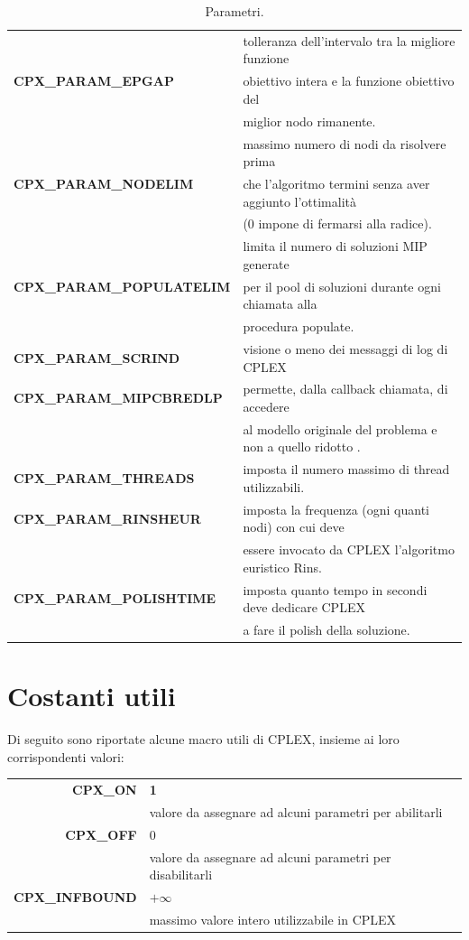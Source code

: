 \begin{table}[h]
\centering\footnotesize
\begin{tabular}{|l|l|}
\hline
\multirow{3}{*}{\textbf{CPX\_PARAM\_EPGAP}} & {tolleranza dell'intervalo tra la migliore funzione }\\
& {obiettivo intera e la funzione obiettivo del}\\
& {miglior nodo rimanente.}\\
\hline
\multirow{3}{*}{\textbf{CPX\_PARAM\_NODELIM}} & {massimo numero di nodi da risolvere prima}\\
& {che l'algoritmo termini senza aver aggiunto l'ottimalità}\\
& {(0 impone di fermarsi alla radice).}\\
\hline
\multirow{3}{*}{\textbf{CPX\_PARAM\_POPULATELIM}} & {limita il numero di soluzioni MIP generate }\\
& {per il pool di soluzioni durante ogni chiamata alla}\\
&{procedura populate.}\\
\hline
\textbf{CPX\_PARAM\_SCRIND} & {visione o meno dei messaggi di log di CPLEX}\\
\hline
\textbf{CPX\_PARAM\_MIPCBREDLP} & {permette, dalla callback chiamata, di accedere  }\\
&{al modello originale del problema e non a quello ridotto .}\\
\hline
\textbf{CPX\_PARAM\_THREADS} & {imposta il numero massimo di thread utilizzabili. }\\
\hline
\textbf{CPX\_PARAM\_RINSHEUR} & {imposta la frequenza (ogni quanti nodi) con cui deve}\\
&{essere invocato da CPLEX l'algoritmo euristico Rins.}\\
\hline
\textbf{CPX\_PARAM\_POLISHTIME} & {imposta quanto tempo in secondi deve dedicare CPLEX}\\
&{a fare il polish della soluzione.}\\
\hline
\end{tabular}
\caption{Parametri.}\label{param_table}
\end{table}
\section{Costanti utili}
Di seguito sono riportate alcune macro utili di CPLEX, insieme ai loro corrispondenti valori:
\begin{table}[h]
\footnotesize\centering
\begin{tabular}{|r|l|}
\hline
\textbf{CPX\_ON} & {\textbf{1}}\\
{} & {valore da assegnare ad alcuni parametri per abilitarli}\\
\hline
\textbf{CPX\_OFF} & {0}\\
{} & {valore da assegnare ad alcuni parametri per disabilitarli}\\
\hline
\textbf{CPX\_INFBOUND} & {$+\infty$}\\
{} & {massimo valore intero utilizzabile in CPLEX}\\
\hline
\end{tabular}
\end{table}
